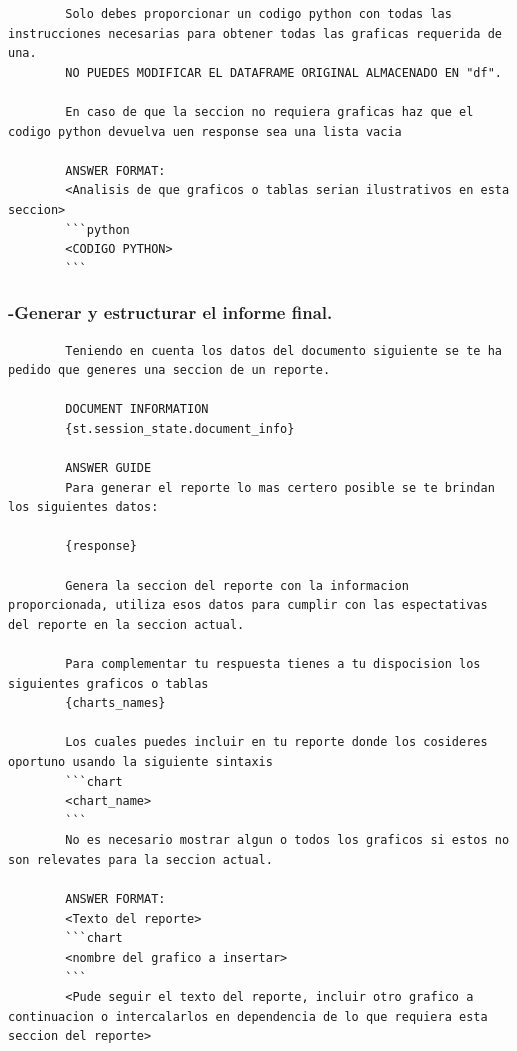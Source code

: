 \begin{anexos}
\begin{lstlisting}
		Solo debes proporcionar un codigo python con todas las instrucciones necesarias para obtener todas las graficas requerida de una.
		NO PUEDES MODIFICAR EL DATAFRAME ORIGINAL ALMACENADO EN "df".
		
		En caso de que la seccion no requiera graficas haz que el codigo python devuelva uen response sea una lista vacia
		
		ANSWER FORMAT:
		<Analisis de que graficos o tablas serian ilustrativos en esta seccion>
		```python
		<CODIGO PYTHON>
		```
	\end{lstlisting}
	
	\subsubsection{-Generar y estructurar el informe final.}
	\begin{lstlisting}
		Teniendo en cuenta los datos del documento siguiente se te ha pedido que generes una seccion de un reporte.
		
		DOCUMENT INFORMATION
		{st.session_state.document_info}
		
		ANSWER GUIDE
		Para generar el reporte lo mas certero posible se te brindan los siguientes datos:
		
		{response}
		
		Genera la seccion del reporte con la informacion proporcionada, utiliza esos datos para cumplir con las espectativas del reporte en la seccion actual.
		
		Para complementar tu respuesta tienes a tu dispocision los siguientes graficos o tablas
		{charts_names}
		
		Los cuales puedes incluir en tu reporte donde los cosideres oportuno usando la siguiente sintaxis
		```chart
		<chart_name>
		```
		No es necesario mostrar algun o todos los graficos si estos no son relevates para la seccion actual.
		
		ANSWER FORMAT:
		<Texto del reporte>
		```chart
		<nombre del grafico a insertar>
		```
		<Pude seguir el texto del reporte, incluir otro grafico a continuacion o intercalarlos en dependencia de lo que requiera esta seccion del reporte>
	\end{lstlisting}
	

\end{anexos}

